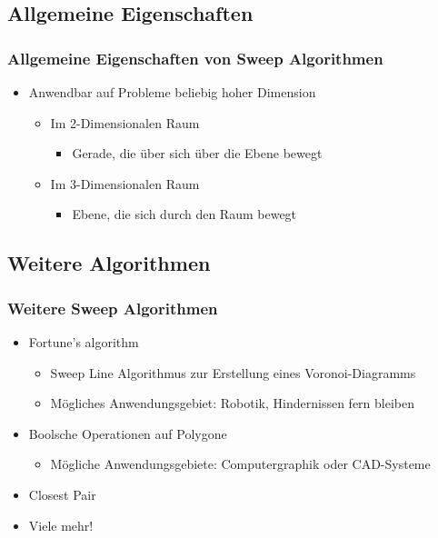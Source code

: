 \subsection{Allgemeine Eigenschaften}
\begin{frame}
	\frametitle{{Allgemeine Eigenschaften von Sweep Algorithmen}}
	\begin{itemize}
		\item Anwendbar auf Probleme beliebig hoher Dimension
		\begin{itemize}
			\pause
			\item{Im 2-Dimensionalen Raum}
			\begin{itemize}
				\item{Gerade, die \"uber sich über die Ebene bewegt}
			\end{itemize}
			\pause
			\item{Im 3-Dimensionalen Raum}
			\begin{itemize}
				\item{Ebene, die sich durch den Raum bewegt}
			\end{itemize}
		\end{itemize}
	\end{itemize}
\end{frame}

\subsection{Weitere Algorithmen}
\begin{frame}
	\frametitle{{Weitere Sweep Algorithmen}}
	\begin{itemize}
		\pause
		\item Fortune's algorithm
		\begin{itemize}
			\item Sweep Line Algorithmus zur Erstellung eines Voronoi-Diagramms
			\pause			
			\item M\"ogliches Anwendungsgebiet: Robotik, Hindernissen fern bleiben
		\end{itemize}
		\pause
		\item Boolsche Operationen auf Polygone
		\begin{itemize}
			\item M\"ogliche Anwendungsgebiete: Computergraphik oder CAD-Systeme
		\end{itemize}
		\pause
		\item Closest Pair
		\pause
		\item Viele mehr!
	\end{itemize}
\end{frame}
